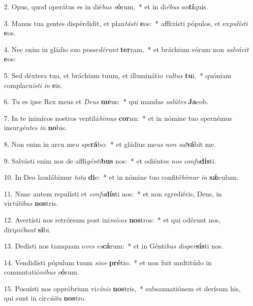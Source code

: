 2. Opus, quod operátus es in dié\textit{bus} \textit{e}\textbf{ó}rum,~*  et in di\textit{é}\textit{bus} \textit{an}\textbf{tí}quis.\

3. Manus tua gentes dispérdidit, et plan\textit{tás}\textit{ti} \textbf{e}os:~*  afflixísti pópulos, et ex\textit{pu}\textit{lís}\textit{ti} \textbf{e}os.\

4. Nec enim in gládio suo posse\textit{dé}\textit{runt} \textbf{ter}ram,~*  et bráchium eórum non \textit{sal}\textit{vá}\textit{vit} \textbf{e}os:\

5. Sed déxtera tua, et bráchium tuum, et illuminátio \textit{vul}\textit{tus} \textbf{tu}i,~*  quóniam complacu\textit{ís}\textit{ti} \textit{in} \textbf{e}is.\

6. Tu es ipse Rex meus et \textit{De}\textit{us} \textbf{me}us:~*  qui mandas \textit{sa}\textit{lú}\textit{tes} \textbf{Ja}cob.\

7. In te inimícos nostros ventilá\textit{bi}\textit{mus} \textbf{cor}nu:~*  et in nómine tuo spernémus insur\textit{gén}\textit{tes} \textit{in} \textbf{no}bis.\

8. Non enim in arcu me\textit{o} \textit{spe}\textbf{rá}bo:~*  et gládius me\textit{us} \textit{non} \textit{sal}\textbf{vá}bit me.\

9. Salvásti enim nos de affli\textit{gén}\textit{ti}\textbf{bus} nos:~*  et odiéntes \textit{nos} \textit{con}\textit{fu}\textbf{dís}ti.\

10. In Deo laudábimur \textit{to}\textit{ta} \textbf{di}e:~*  et in nómine tuo confité\textit{bi}\textit{mur} \textit{in} \textbf{sǽ}culum.\

11. Nunc autem repulísti et \textit{con}\textit{fu}\textbf{dís}ti nos:~*  et non egrediéris, Deus, in vir\textit{tú}\textit{ti}\textit{bus} \textbf{nos}tris.\

12. Avertísti nos retrórsum post ini\textit{mí}\textit{cos} \textbf{nos}tros:~*  et qui odérunt nos, diri\textit{pi}\textit{é}\textit{bant} \textbf{si}bi.\

13. Dedísti nos tamquam o\textit{ves} \textit{es}\textbf{cá}rum:~*  et in Génti\textit{bus} \textit{di}\textit{sper}\textbf{sís}ti nos.\

14. Vendidísti pópulum tuum \textit{si}\textit{ne} \textbf{pré}tio:~*  et non fuit multitúdo in commutatió\textit{ni}\textit{bus} \textit{e}\textbf{ó}rum.\

15. Posuísti nos oppróbrium vi\textit{cí}\textit{nis} \textbf{nos}tris,~*  subsannatiónem et derísum his, qui sunt in cir\textit{cú}\textit{i}\textit{tu} \textbf{nos}tro.\

